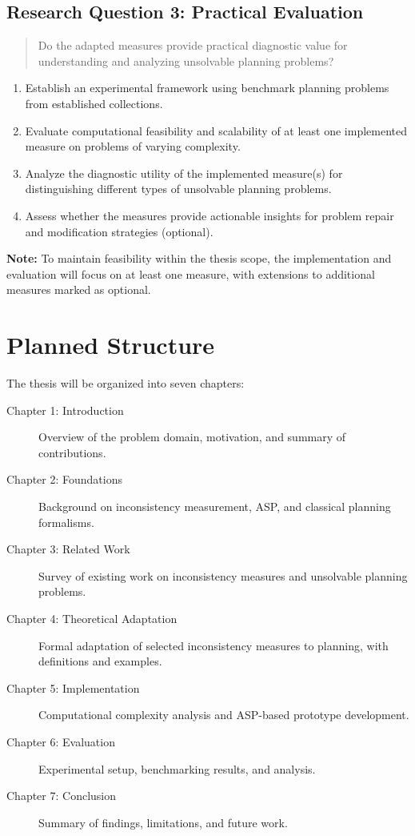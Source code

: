 \documentclass[proposal,english,palatino]{AIGpaper}
\begin{document}
\subsection{Research Question 3: Practical Evaluation}

\begin{quote}
  Do the adapted measures provide practical diagnostic value for understanding and analyzing unsolvable planning problems?
\end{quote}

\begin{enumerate}
  \item[(3a)] Establish an experimental framework using benchmark planning problems from established collections.
  \item[(3b)] Evaluate computational feasibility and scalability of at least one implemented measure on problems of varying complexity.
  \item[(3c)] Analyze the diagnostic utility of the implemented measure(s) for distinguishing different types of unsolvable planning problems.
  \item[(3d)] Assess whether the measures provide actionable insights for problem repair and modification strategies (optional).
\end{enumerate}

\textbf{Note:} To maintain feasibility within the thesis scope, the implementation and evaluation will focus on at least one measure, with extensions to additional measures marked as optional.

\section{Planned Structure}

The thesis will be organized into seven chapters:

\begin{description}
  \item[Chapter 1: Introduction] Overview of the problem domain, motivation, and summary of contributions.
  \item[Chapter 2: Foundations] Background on inconsistency measurement, \ac{ASP}, and classical planning formalisms.
  \item[Chapter 3: Related Work] Survey of existing work on inconsistency measures and unsolvable planning problems.
  \item[Chapter 4: Theoretical Adaptation] Formal adaptation of selected inconsistency measures to planning, with definitions and examples.
  \item[Chapter 5: Implementation] Computational complexity analysis and \ac{ASP}-based prototype development.
  \item[Chapter 6: Evaluation] Experimental setup, benchmarking results, and analysis.
  \item[Chapter 7: Conclusion] Summary of findings, limitations, and future work.
\end{description}
\end{document}
